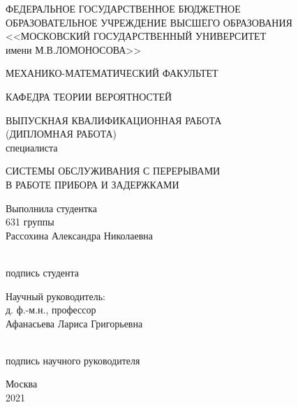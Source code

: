 \documentclass[12pt]{article}
\begin{document}
\begin{titlepage}
\large
\begin{center}
ФЕДЕРАЛЬНОЕ ГОСУДАРСТВЕННОЕ БЮДЖЕТНОЕ\\ ОБРАЗОВАТЕЛЬНОЕ УЧРЕЖДЕНИЕ ВЫСШЕГО ОБРАЗОВАНИЯ \\ <<МОСКОВСКИЙ ГОСУДАРСТВЕННЫЙ УНИВЕРСИТЕТ \\ имени М.В.ЛОМОНОСОВА>>  
\end{center}
\begin{center}
МЕХАНИКО-МАТЕМАТИЧЕСКИЙ ФАКУЛЬТЕТ
\end{center}
\begin{center}
КАФЕДРА ТЕОРИИ ВЕРОЯТНОСТЕЙ
\end{center}
\parskip=50pt 
\begin{center}
ВЫПУСКНАЯ КВАЛИФИКАЦИОННАЯ РАБОТА \\
(ДИПЛОМНАЯ РАБОТА)\\
специалиста
\end{center}
\parskip=20pt 
\begin{center}
СИСТЕМЫ ОБСЛУЖИВАНИЯ С ПЕРЕРЫВАМИ \\
В РАБОТЕ ПРИБОРА И ЗАДЕРЖКАМИ
\end{center}
\parskip=60pt 
\begin{flushleft}
\leftskip=9cm \rightskip=0cm
Выполнила студентка\\
631 группы \\
Рассохина Александра Николаевна
\end{flushleft}
\parskip=25pt
\begin{flushleft}
\leftskip=9cm \rightskip=0cm
\underline{\hspace{4cm}}\\
подпись студента
\end{flushleft}
\parskip=10pt
\begin{flushleft}
\leftskip=9cm \rightskip=0cm
Научный руководитель:\\
д. ф.-м.н., профессор \\Афанасьева Лариса Григорьевна
\end{flushleft}
\parskip=25pt
\begin{flushleft}
\leftskip=9cm \rightskip=0cm
\underline{\hspace{4cm}}\\
подпись научного руководителя
\end{flushleft}
\vspace{1.3cm}
\begin{center}
Москва\\
2021
\end{center}
\end{titlepage}
\end{document}
